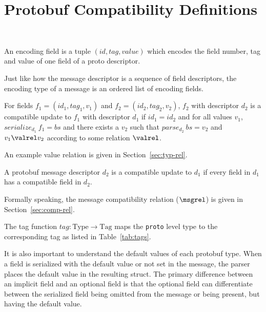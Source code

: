 \section{Protobuf Compatibility Definitions}~\label{sec:proto-compat}

\begin{definition}
	An encoding field is a tuple $(id, tag, value)$ which encodes the field
	number, tag and value of one field of a proto descriptor.
\end{definition}

Just like how the message descriptor is a sequence of field descriptors, the
encoding type of a message is an ordered list of encoding fields.

\vspace{1em}
\begin{definition}
	For fields $f_1 = (id_1, tag_1, v_1)$ and $f_2 = (id_2, tag_2, v_2)$, $f_2$
	with descriptor $d_2$ is a compatible update to $f_1$ with descriptor $d_1$ if
	$id_1 = id_2$ and for all values $v_1$, $serialize_{d_1}\ f_1 = bs$ and there
	exists a $v_2$ such that $parse_{d_2}\ bs = v_2$ and $v_1 \valrel v_2$ according to
	some relation $\valrel$.
\end{definition}

An example value relation is given in Section~\ref{sec:typ-rel}.

\vspace{1em}
\begin{definition}
	A protobuf message descriptor $d_2$ is a compatible update to $d_1$ if every
	field in $d_1$ has a compatible field in $d_2$.
\end{definition}

Formally speaking, the message compatibility relation ($\msgrel$) is given in
Section~\ref{sec:comp-rel}.

\vspace{1em}
\begin{definition}
  The tag function $tag : \text{Type} \rightarrow \text{Tag}$ maps the \texttt{proto}
  level type to the corresponding tag as listed in Table~\ref{tab:tags}.
\end{definition}

It is also important to understand the default values of each protobuf
type. When a field is serialized with the default value or not set in the
message, the parser places the default value in the resulting struct. The
primary difference between an implicit field and an optional field is that the
optional field can differentiate between the serialized field being omitted from
the message or being present, but having the default value.

